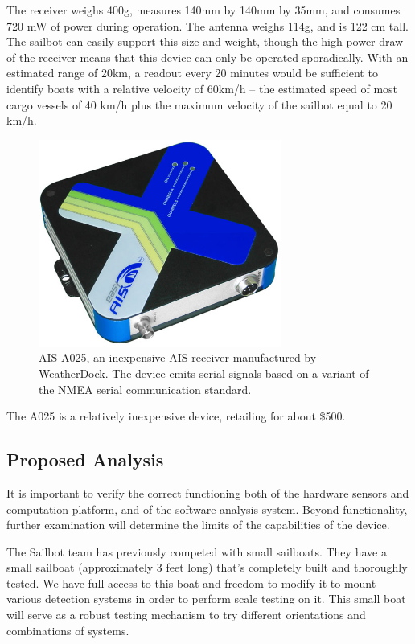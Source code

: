 The receiver weighs 400g, measures 140mm by 140mm by 35mm, and consumes 720 mW of power during operation. The antenna weighs 114g, and is 122 cm tall. The sailbot can easily support this size and weight, though the high power draw of the receiver means that this device can only be operated sporadically. With an estimated range of 20km, a readout every 20 minutes would be sufficient to identify boats with a relative velocity of 60km/h -- the estimated speed of most cargo vessels of 40 km/h plus the maximum velocity of the sailbot equal to 20 km/h.

\begin{figure}
\centering
\includegraphics[width=80mm,natwidth=540,natheight=459]{"./image/ais-a025"}
\caption[AIS A025 by WeatherDock.]{\label{fig:easyais-a025}AIS A025, an inexpensive AIS receiver manufactured by WeatherDock. The device emits serial signals based on a variant of the NMEA serial communication standard.}
\end{figure}

The A025 is a relatively inexpensive device, retailing for about \$500. 


\subsection{\label{sec:method:proposed-analysis}Proposed Analysis}
It is important to verify the correct functioning both of the hardware sensors and computation platform, and of the software analysis system. Beyond functionality, further examination will determine the limits of the capabilities of the device.

The Sailbot team has previously competed with small sailboats. They have a small sailboat (approximately 3 feet long) that's completely built and thoroughly tested. We have full access to this boat and freedom to modify it to mount various detection systems in order to perform scale testing on it. This small boat will serve as a robust testing mechanism to try different orientations and combinations of systems.


